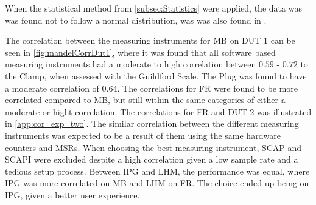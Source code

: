 When the statistical method from \cref{subsec:Statistics} were applied, the data was was found not to follow a normal distribution, was was also found in \cite{biksbois, Koedijk2022diff}.%


The correlation between the measuring instruments for MB on DUT 1 can be seen in \cref{fig:mandelCorrDut1}, where it was found that all software based measuring instruments had a moderate to high correlation between $0.59$ - $0.72$ to the Clamp, when assessed with the Guildford Scale. The Plug was found to have a moderate correlation of $0.64$. The correlations for FR were found to be more correlated compared to MB, but still within the same categories of either a moderate or hight correlation. The correlations for FR and DUT 2 was illustrated in \cref{app:cor_exp_two}. The similar correlation between the different measuring instruments was expected to be a result of them using the same hardware counters and MSRs. When choosing the best measuring instrument, SCAP and SCAPI were excluded despite a high correlation given a low sample rate and a tedious setup process. Between IPG and LHM, the performance was equal, where IPG was more correlated on MB and LHM on FR. The choice ended up being on IPG, given a better user experience. 


